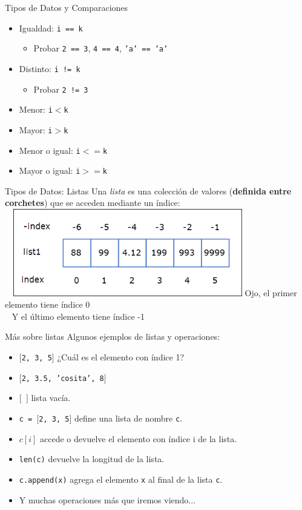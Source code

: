 \documentclass{beamer}
\begin{document}
\begin{frame}{Tipos de Datos y Comparaciones}
\begin{itemize}
	\item Igualdad: \texttt{i == k}\pause
	\begin{itemize}
		\item Probar \texttt{2 == 3}, \texttt{4 == 4}, \texttt{'a' == 'a'}
	\end{itemize}\pause
	\item Distinto: \texttt{i != k}\pause
	\begin{itemize}
		\item  Probar \texttt{2 != 3}
	\end{itemize}\pause
	\item Menor: \texttt{i$<$k}\pause
	\item Mayor: \texttt{i$>$k}\pause
	\item Menor o igual: \texttt{i$<=$k}\pause
	\item Mayor o igual: \texttt{i$>=$k}
\end{itemize}
\end{frame}



\begin{frame}{Tipos de Datos:  Listas}
Una \emph{lista} es una colección de valores (\textbf{definida entre corchetes}) que se acceden mediante un índice:  \pause
\\~\
\includegraphics[width=10cm]{recursos/lista.png} \pause
\alert{Ojo, el primer elemento tiene índice 0}\pause
\\~
\alert{Y el último elemento tiene índice -1}
\end{frame}


\begin{frame}{Más sobre listas}
Algunos ejemplos de listas y operaciones:
\begin{itemize}
	\item \texttt{$[$2, 3, 5$]$} \pause 
		¿Cuál es el elemento con índice 1?\pause
	\item \texttt{$[$2, 3.5, 'cosita', 8$]$}\pause
	\item \texttt{$[$ $]$} lista vacía.\pause
	\item \texttt{c = $[$2, 3, 5$]$} define una lista de nombre \texttt{c}. \pause
	\item \texttt{$c[i]$} accede o devuelve el elemento con índice i de la lista.\pause
	\item \texttt{len(c)} devuelve la longitud de la lista.\pause
	\item \texttt{c.append(x)} agrega el elemento \texttt{x} al final de la lista \texttt{c}.
	\item Y muchas operaciones más que iremos viendo...
\end{itemize}
\end{frame}
\end{document}
